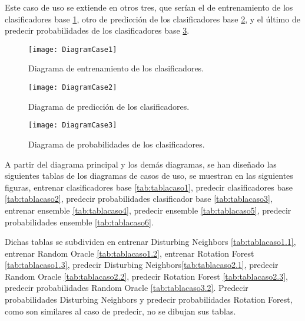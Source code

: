 Este caso de uso se extiende en otros tres, que serían el de entrenamiento de los clasificadores base \ref{fig:DiagramCase1}, otro de predicción de los clasificadores base \ref{fig:DiagramCase2}, y el último de predecir probabilidades de los clasificadores base \ref{fig:DiagramCase3}.	

\begin{figure}
\centering
\texttt{[image: DiagramCase1]}
\caption{Diagrama de entrenamiento de los clasificadores.}
\label{fig:DiagramCase1}
\end{figure}

\begin{figure}
\centering
\texttt{[image: DiagramCase2]}
\caption{Diagrama de predicción de los clasificadores.}
\label{fig:DiagramCase2}
\end{figure}

\begin{figure}
\centering
\texttt{[image: DiagramCase3]}
\caption{Diagrama de probabilidades de los clasificadores.}
\label{fig:DiagramCase3}
\end{figure}

A partir del diagrama principal y los demás diagramas, se han diseñado las siguientes tablas de los diagramas de casos de uso, se muestran en las siguientes figuras, entrenar clasificadores base  \ref{tab:tablacaso1}, predecir clasificadores base \ref{tab:tablacaso2}, predecir probabilidades clasificador base \ref{tab:tablacaso3}, entrenar ensemble \ref{tab:tablacaso4}, predecir ensemble \ref{tab:tablacaso5}, predecir probabilidades ensemble \ref{tab:tablacaso6}. 

Dichas tablas se subdividen en entrenar Disturbing Neighbors \ref{tab:tablacaso1.1}, entrenar Random Oracle \ref{tab:tablacaso1.2}, entrenar Rotation Forest \ref{tab:tablacaso1.3}, predecir Disturbing Neighbors\ref{tab:tablacaso2.1}, predecir Random Oracle \ref{tab:tablacaso2.2}, predecir Rotation Forest \ref{tab:tablacaso2.3}, predecir probabilidades Random Oracle \ref{tab:tablacaso3.2}. Predecir probabilidades Disturbing Neighbors y predecir probabilidades Rotation Forest, como son similares al caso de predecir, no se dibujan sus tablas.

